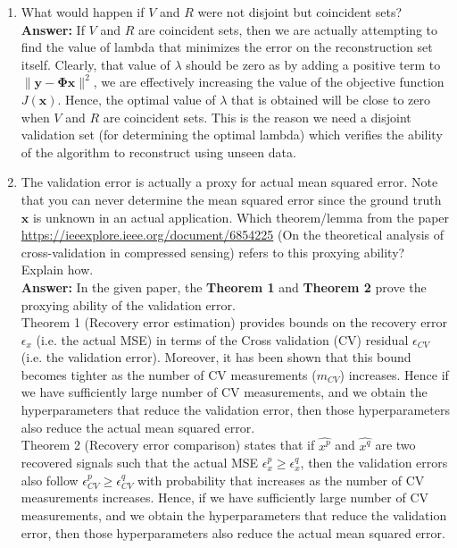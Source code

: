 \documentclass[12pt]{article}
\begin{document}
\begin{itemize}
\begin{enumerate}
\item What would happen if $V$ and $R$ were not disjoint but coincident sets? \\
\textbf{Answer:} If $V$ and $R$ are coincident sets, then we are actually attempting to find the value of lambda that minimizes the error on the reconstruction set itself. Clearly, that value of $\lambda$ should be zero as by adding a positive term to $ \| \boldsymbol{y}-\boldsymbol{\Phi x}\|^2 $, we are effectively increasing the value of the objective function $J(\boldsymbol{x})$. Hence, the optimal value of $\lambda$ that is obtained will be close to zero when $V$ and $R$ are coincident sets. This is the reason we need a disjoint validation set (for determining the optimal lambda) which verifies the ability of the algorithm to reconstruct using unseen data.



\item The validation error is actually a proxy for actual mean squared error. Note that you can never determine the mean squared error since the ground truth $\boldsymbol{x}$ is unknown in an actual application. Which theorem/lemma from the paper \url{https://ieeexplore.ieee.org/document/6854225} (On the theoretical analysis of cross-validation in compressed sensing) refers to this proxying ability? Explain how.  \\
\textbf{Answer:} In the given paper, the \textbf{Theorem 1} and \textbf{Theorem 2} prove the proxying ability of the validation error. \\

Theorem 1 (Recovery error estimation) provides bounds on the recovery error $\epsilon_x$ (i.e. the actual MSE) in terms of the Cross validation (CV) residual $\epsilon_{CV}$ (i.e. the validation error). Moreover, it has been shown that this bound becomes tighter as the number of CV measurements ($m_{CV}$) increases. Hence if we have sufficiently large number of CV measurements, and we obtain the hyperparameters that reduce the validation error, then those hyperparameters also reduce the actual mean squared error. \\

Theorem 2 (Recovery error comparison) states that if $\hat{x^p}$ and $\hat{x^q}$ are two recovered signals such that the actual MSE $\epsilon_x^p \geq \epsilon_x^q$, then the validation errors also follow $ \epsilon_{CV}^p \geq \epsilon_{CV}^q$ with probability that increases as the number of CV measurements increases. Hence, if we have sufficiently large number of CV measurements, and we obtain the hyperparameters that reduce the validation error, then those hyperparameters also reduce the actual mean squared error. \\


\end{enumerate}
\end{itemize}
\end{document}
